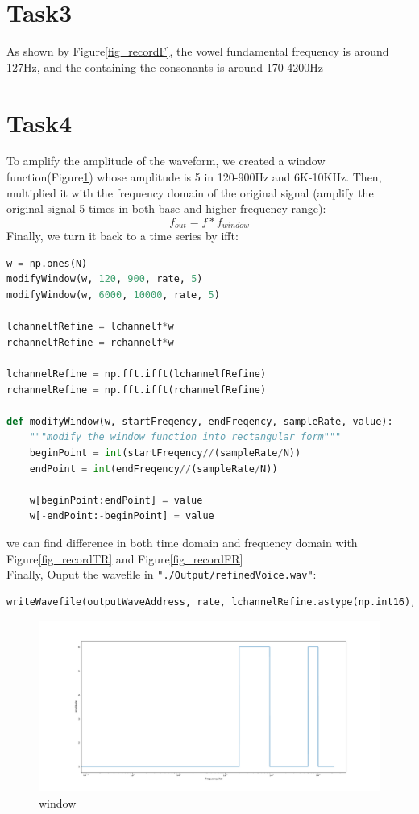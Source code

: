 \documentclass[a4paper,12pt]{article}
\begin{document}
\section{Task3}
As shown by Figure\ref{fig_recordF}, the vowel fundamental frequency is around 127Hz, and the containing the consonants is around  170-4200Hz
\section{Task4}
To amplify the amplitude of the waveform,  we created a window function(Figure\ref{fig_window}) whose amplitude is 5 in 120-900Hz and 6K-10KHz. Then,  multiplied it with the frequency domain of the original signal (amplify the original signal 5 times in both base and higher frequency range):
$$f_{out}=f*f_{window}$$
Finally, we turn it back to a time series by ifft:
\begin{lstlisting}[language=Python]
w = np.ones(N)
modifyWindow(w, 120, 900, rate, 5)
modifyWindow(w, 6000, 10000, rate, 5)

lchannelfRefine = lchannelf*w
rchannelfRefine = rchannelf*w

lchannelRefine = np.fft.ifft(lchannelfRefine)
rchannelRefine = np.fft.ifft(rchannelfRefine)

def modifyWindow(w, startFreqency, endFreqency, sampleRate, value):
	"""modify the window function into rectangular form"""
	beginPoint = int(startFreqency//(sampleRate/N))
	endPoint = int(endFreqency//(sampleRate/N))
	
	w[beginPoint:endPoint] = value
	w[-endPoint:-beginPoint] = value
\end{lstlisting}
we can find difference in both time domain and frequency domain with Figure\ref{fig_recordTR} and Figure\ref{fig_recordFR}\\
Finally, Ouput the wavefile in \lstinline{"./Output/refinedVoice.wav"}:
\begin{lstlisting}[language=Python]
writeWavefile(outputWaveAddress, rate, lchannelRefine.astype(np.int16), rchannelRefine.astype(np.int16))
\end{lstlisting}
\begin{figure}[h]   
	\centering 
	\includegraphics[width=12cm]{../Output/Figures/window.pdf} 
	\caption{window}   
	\label{fig_window}
\end{figure}
\end{document}
